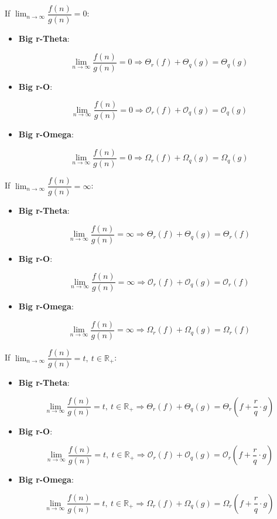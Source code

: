 If $\lim_{n\to\infty} \dfrac{f(n)}{g(n)} = 0$:
\begin{itemize}
  \item \textbf{Big r-Theta}: 
	\begin{lemma} 
  \[  \lim_{n\to\infty} \dfrac{f(n)}{g(n)} = 0 \Rightarrow \Theta_{r}(f) + \Theta_{q}(g) = \Theta_{q}(g)\]
  	\end{lemma} 
  \item \textbf{Big r-O}: 
	\begin{lemma} 
  \[  \lim_{n\to\infty} \dfrac{f(n)}{g(n)} = 0 \Rightarrow \mathcal{O}_{r}(f) + \mathcal{O}_{q}(g) = \mathcal{O}_{q}(g)\]
	\end{lemma} 
  \item \textbf{Big r-Omega}: 
	\begin{lemma} 
  \[  \lim_{n\to\infty} \dfrac{f(n)}{g(n)} = 0 \Rightarrow \Omega_{r}(f) + \Omega_{q}(g) = \Omega_{q}(g)\]
	\end{lemma} 
\end{itemize}


If $\lim_{n\to\infty} \dfrac{f(n)}{g(n)} = \infty$:
\begin{itemize}
  \item \textbf{Big r-Theta}: 
	\begin{lemma} 
  \[  \lim_{n\to\infty} \dfrac{f(n)}{g(n)} = \infty \Rightarrow \Theta_{r}(f) + \Theta_{q}(g) = \Theta_{r}(f)\]
	\end{lemma} 
  \item \textbf{Big r-O}: 
	\begin{lemma} 
  \[ \lim_{n\to\infty} \dfrac{f(n)}{g(n)} = \infty \Rightarrow \mathcal{O}_{r}(f) + \mathcal{O}_{q}(g) = \mathcal{O}_{r}(f)\]
	\end{lemma} 
  \item \textbf{Big r-Omega}: 
	\begin{lemma} 
  \[ \lim_{n\to\infty} \dfrac{f(n)}{g(n)} = \infty \Rightarrow \Omega_{r}(f) + \Omega_{q}(g) = \Omega_{r}(f)\]
	\end{lemma} 
\end{itemize}

If $\lim_{n\to\infty} \dfrac{f(n)}{g(n)} = t, \ t \in \mathbb{R}_{+}$:
\begin{itemize}
  \item \textbf{Big r-Theta}: 
	\begin{lemma} 
  \[ \lim_{n\to\infty} \dfrac{f(n)}{g(n)} = t, \ t \in \mathbb{R}_{+} \Rightarrow \Theta_{r}(f) + \Theta_{q}(g) = \Theta_{r}(f + \dfrac{r}{q} \cdot g)\]
	\end{lemma} 
  \item \textbf{Big r-O}: 
	\begin{lemma} 
  \[ \lim_{n\to\infty} \dfrac{f(n)}{g(n)} = t, \ t \in \mathbb{R}_{+} \Rightarrow \mathcal{O}_{r}(f) + \mathcal{O}_{q}(g) = \mathcal{O}_{r}(f + \dfrac{r}{q} \cdot g)\]
	\end{lemma} 
  \item \textbf{Big r-Omega}: 
	\begin{lemma} 
  \[ \lim_{n\to\infty} \dfrac{f(n)}{g(n)} = t, \ t \in \mathbb{R}_{+} \Rightarrow \Omega_{r}(f) + \Omega_{q}(g) = \Omega_{r}(f + \dfrac{r}{q} \cdot g)\]
	\end{lemma} 
\end{itemize}

